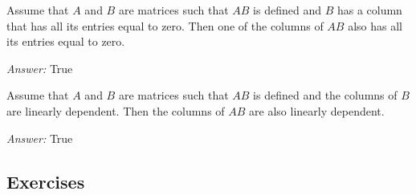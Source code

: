 \documentclass[letterpaper]{article}
\newcommand{\ans}{\textit{Answer: }}
\newenvironment{question}[2][Question]{\begin{trivlist}
\item[\hskip \labelsep {\bfseries #1}\hskip \labelsep {\bfseries #2.}]}{\end{trivlist}}
\begin{document}
\begin{question}{3.15}
    Assume that $A$ and $B$ are matrices such that $A B$ is defined and $B$ has a column
    that has all its entries equal to zero. Then one of the columns of $A B$ also has all
    its entries equal to zero.

    \ans True
\end{question}

\begin{question}{3.18}
    Assume that $A$ and $B$ are matrices such that $A B$ is defined and the columns of $B$
    are linearly dependent. Then the columns of $A B$ are also linearly dependent.

    \ans True
\end{question}

\subsection{Exercises}
\end{document}
